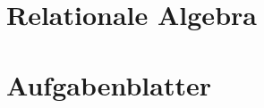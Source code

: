 \documentclass[12pt,oneside]{book}
\begin{document}
	
	
	\tableofcontents
	\clearpage

	\chapter{Relationale Algebra}
	
	
	
	\chapter{Aufgabenblatter}
	\newpage
	
\end{document}
